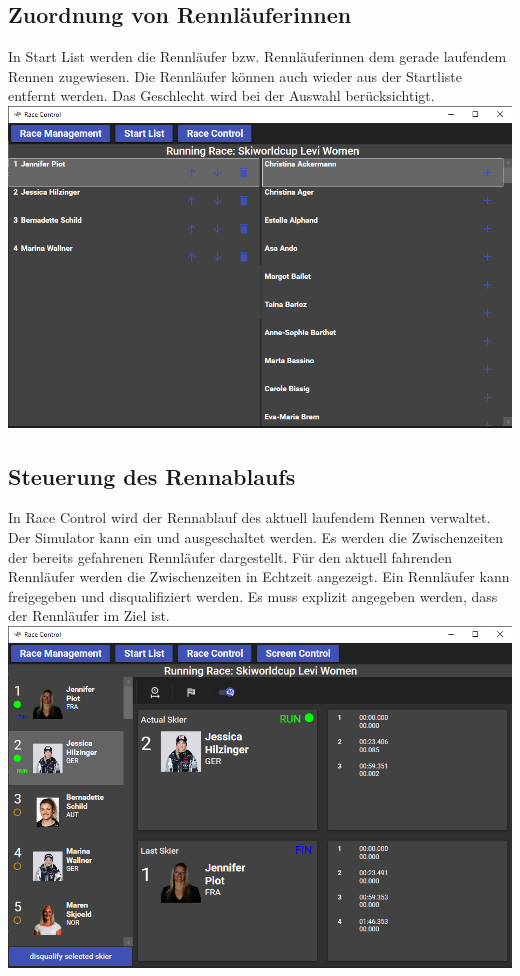 \documentclass[a4paper, 12pt]{article}
\begin{document}
	\subsection{Zuordnung von Rennläuferinnen}
	In Start List werden die Rennläufer bzw. Rennläuferinnen dem gerade laufendem Rennen zugewiesen. Die Rennläufer können auch wieder aus der Startliste entfernt werden. Das Geschlecht wird bei der Auswahl berücksichtigt.
	\newline
	\includegraphics[width=.7\textwidth]{img/ui_startList.png}
	\newline
	
	\subsection{Steuerung des Rennablaufs}
	In Race Control wird der Rennablauf des aktuell laufendem Rennen verwaltet. Der Simulator kann ein und ausgeschaltet werden. Es werden die Zwischenzeiten der bereits gefahrenen Rennläufer dargestellt. Für den aktuell fahrenden Rennläufer werden die Zwischenzeiten in Echtzeit angezeigt. Ein Rennläufer kann freigegeben und disqualifiziert werden. Es muss explizit angegeben werden, dass der Rennläufer im Ziel ist.
	\newline
	\includegraphics[width=.7\textwidth]{img/ui_raceControl.png}
	\newline
	
\end{document}
